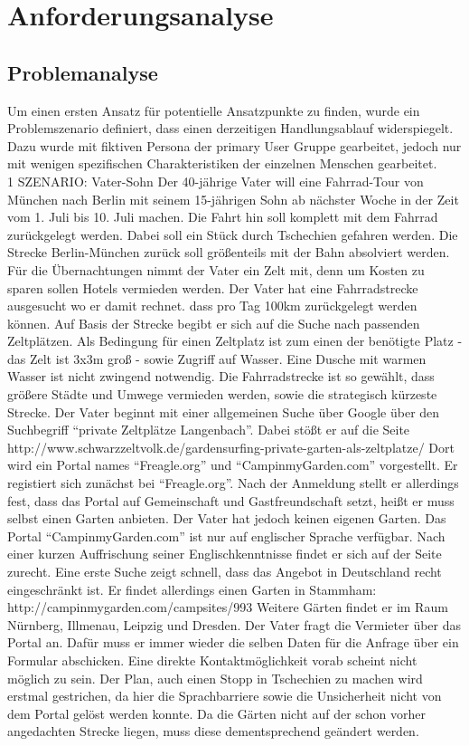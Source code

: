 
\section{Anforderungsanalyse}

\subsection{Problemanalyse}
Um einen ersten Ansatz für potentielle Ansatzpunkte zu finden, wurde ein Problemszenario definiert, dass einen derzeitigen Handlungsablauf widerspiegelt. Dazu wurde mit fiktiven Persona der primary User Gruppe gearbeitet, jedoch nur mit wenigen spezifischen Charakteristiken der einzelnen Menschen gearbeitet.\\

1 SZENARIO: Vater-Sohn
Der 40-jährige Vater will eine Fahrrad-Tour von München nach Berlin mit seinem 15-jährigen Sohn ab nächster Woche in der Zeit vom 1. Juli bis 10. Juli machen. Die Fahrt hin soll komplett mit dem Fahrrad zurückgelegt werden. Dabei soll ein Stück durch Tschechien gefahren werden. Die Strecke Berlin-München zurück soll größenteils mit der Bahn absolviert werden. Für die Übernachtungen nimmt der Vater ein Zelt mit, denn um Kosten zu sparen sollen Hotels vermieden werden.
Der Vater hat eine Fahrradstrecke ausgesucht wo er damit rechnet. dass pro Tag 100km zurückgelegt werden können. Auf Basis der Strecke begibt er sich auf die Suche nach passenden Zeltplätzen. Als Bedingung für einen Zeltplatz ist zum einen der benötigte Platz - das Zelt ist 3x3m groß - sowie Zugriff auf Wasser. Eine Dusche mit warmen Wasser ist nicht zwingend notwendig.
Die Fahrradstrecke ist so gewählt, dass größere Städte und Umwege vermieden werden, sowie die strategisch kürzeste Strecke.
Der Vater beginnt mit einer allgemeinen Suche über Google über den Suchbegriff “private Zeltplätze Langenbach”. Dabei stößt er auf die Seite http://www.schwarzzeltvolk.de/gardensurfing-private-garten-als-zeltplatze/
Dort wird ein Portal names “Freagle.org” und “CampinmyGarden.com” vorgestellt. Er registiert sich zunächst bei “Freagle.org”. Nach der Anmeldung stellt er allerdings fest, dass das Portal auf Gemeinschaft und Gastfreundschaft setzt, heißt er muss selbst einen Garten anbieten. Der Vater hat jedoch keinen eigenen Garten.
Das Portal “CampinmyGarden.com” ist nur auf englischer Sprache verfügbar. Nach einer kurzen Auffrischung seiner Englischkenntnisse findet er sich auf der Seite zurecht. Eine erste Suche zeigt schnell, dass das Angebot in Deutschland recht eingeschränkt ist.
Er findet allerdings einen Garten in Stammham: http://campinmygarden.com/campsites/993
Weitere Gärten findet er im Raum Nürnberg, Illmenau, Leipzig und Dresden. Der Vater fragt die Vermieter über das Portal an. Dafür muss er immer wieder die selben Daten für die Anfrage über ein Formular abschicken. Eine direkte Kontaktmöglichkeit vorab scheint nicht möglich zu sein.
Der Plan, auch einen Stopp in Tschechien zu machen wird erstmal gestrichen, da hier die Sprachbarriere sowie die Unsicherheit nicht von dem Portal gelöst werden konnte.
Da die Gärten nicht auf der schon vorher angedachten Strecke liegen, muss diese dementsprechend geändert werden.

